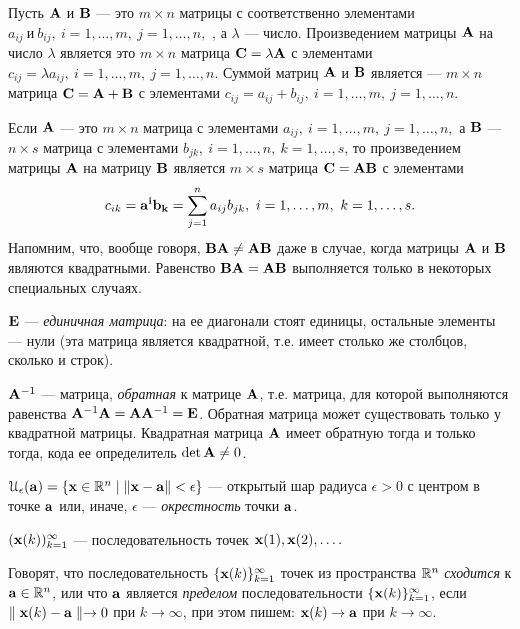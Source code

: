     Пусть $\mathbf{A}$ и $\mathbf{B}$ --- это $m\times n$ матрицы с соответственно элементами
    $a_{ij} \ \text{и} \ b_{ij}, \ i=1,\ldots,m, \ j=1,\ldots,n,$ , а $\lambda$ ---
    число. Произведением матрицы $\mathbf{A}$ на число $\lambda$
    является это $m\times n$ матрица
         $\mathbf{C}=\lambda\mathbf{A}$ с элементами
    $c_{ij}=\lambda a_{ij}, \ i=1,\ldots,m, \ j=1,\ldots,n$. Суммой матриц
    $\mathbf{A}$ и $\mathbf{B}$ является
    --- $m\times n$ матрица $\mathbf{C}=\mathbf{A+B}$ с элементами $c_{ij}=a_{ij}+b_{ij}, \ i=1,\ldots,m, \
    j=1,\ldots,n$.


    Если $\mathbf{A}$ --- это $m\times n$ матрица с элементами
    $a_{ij}, \ i=1,\ldots,m, \ j=1,\ldots,n,$ а $\mathbf{B}$ ---
    $n\times s$ матрица с элементами
    $b_{jk}, \ i=1,\ldots,n, \ k=1,\ldots,s$, то произведением
    матрицы $\mathbf{A}$ на матрицу $\mathbf{B}$ является $m\times s$ матрица
    $\mathbf{C}=\mathbf{A}\mathbf{B}$ с элементами
\[
    c_{ik}=\mathbf{a^{i}}\mathbf{b_{k}}=\sum_{j=1}^{n}a_{ij}b_{jk}, \ i=1,\ldots,m,
    \  k=1,\ldots,s.
\]
    Напомним, что, вообще говоря, $\mathbf{B}\mathbf{A}\neq\mathbf{A}\mathbf{B}$ даже в случае,
    когда матрицы $\mathbf{A}$ и $\mathbf{B}$ являются квадратными.
    Равенство $\mathbf{B}\mathbf{A}=\mathbf{A}\mathbf{B}$ выполняется только в
    некоторых специальных случаях.


    $\mathbf{E}$ --- \emph{единичная матрица}: на ее диагонали стоят единицы, остальные элементы ---
    нули (эта матрица является квадратной, т.е. имеет столько же столбцов, сколько и
    строк).


    $\mathbf{A}^{-1}$ --- матрица, \emph{обратная} к матрице
    $\mathbf{A}$, т.е. матрица, для которой выполняются равенства
    $\mathbf{A}^{-1}\mathbf{A}=\mathbf{A}\mathbf{A}^{-1}=\mathbf{E}$. Обратная матрица
    может существовать только у квадратной матрицы. Квадратная
    матрица $\mathbf{A}$ имеет обратную тогда и только тогда, кода ее
    определитель $\det\mathbf{A}\neq 0$.

    $\mathcal{U}_{\epsilon}(\mathbf{a})=\{\mathbf{x}\in\mathbb{R}^{n} \mid
    \|\mathbf{x}-\mathbf{a}\|<\epsilon\}$ --- открытый шар радиуса $\epsilon>0$ с
    центром в точке $\mathbf{a}$ или, иначе, $\epsilon$ --- \emph{окрестность}
    точки $\mathbf{a}$.


    $(\mathbf{x}(k))_{k=1}^{\infty}$ --- последовательность точек $\mathbf{x}(1),
    \mathbf{x}(2),\ldots.$

    Говорят, что последовательность $\{\mathbf{x}(k)\}_{k=1}^{\infty}$
    точек из пространства $\mathbb{R}^{n}$ \emph{сходится} к $\mathbf{a}\in\mathbb{R}^{n}$,
    или что $\mathbf{a}$ является \emph{пределом} последовательности
    $\{\mathbf{x}(k)\}_{k=1}^{\infty}$, если
    $\parallel \mathbf{x}(k)-\mathbf{a}\parallel \rightarrow 0$ при
    $k\rightarrow\infty$, при этом пишем:
    $\mathbf{x}(k)\rightarrow\mathbf{a}$ при
    $k\rightarrow\infty$.


